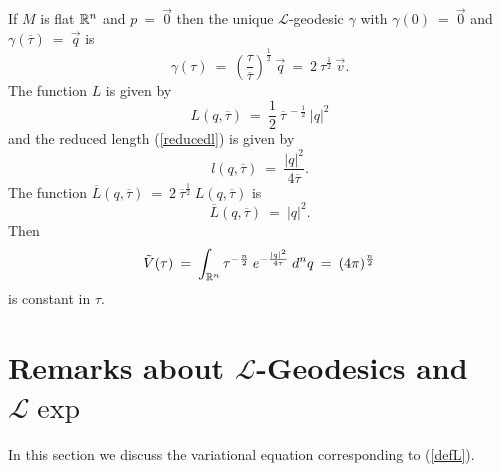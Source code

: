 If $M$ is flat ${\mathbb R}^n$ and $p \: = \: \vec{0}$ then the unique
${\mathcal L}$-geodesic $\gamma$ with $\gamma(0) \: =\: \vec{0}$ and
$\gamma(\overline{\tau}) \: = \: \vec{q}$ is
\begin{equation}
\gamma(\tau) \: = \: \left( \frac{\tau}{\overline{\tau}}
\right)^{\frac12} \: \vec{q} \: = \: 2 \: \tau^{\frac12} \: \vec{v}.
\end{equation}
The function $L$ is given by
\begin{equation}
L(q, \overline{\tau}) \: = \: \frac12 \: \overline{\tau}^{\: -
\frac12} \: |q|^2
\end{equation}
and the reduced length (\ref{reducedl}) is given by
\begin{equation}
l(q, \overline{\tau}) \: = \: \frac{|q|^2}{4 \overline{\tau}}.
\end{equation}
The function $\overline{L}(q, \overline{\tau}) \: = \:
2 \: \overline{\tau}^{\frac12} \: L(q, \overline{\tau})$
is
\begin{equation}
\overline{L}(q, \overline{\tau}) \: = \: |q|^2.
\end{equation}
Then
\begin{equation}
\tilde{V}(\tau) \: = \:
\int_{{\mathbb R}^n} \tau^{-\frac{n}{2}} \: e^{-\frac{|q|^2}{4 {\tau}}} \:
d^nq \: = \: (4\pi)^{\frac{n}{2}}
\end{equation}
is constant in $\tau$.

\section{Remarks about ${\mathcal L}$-Geodesics and
${\mathcal L}\exp$} \label{Lremarks}

In this section we discuss the variational equation corresponding to
(\ref{defL}).

